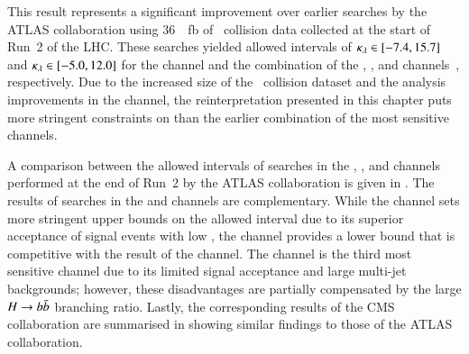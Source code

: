 This result represents a significant improvement over earlier searches by the
ATLAS collaboration using \SI{36}{\per\femto\barn} of \pp~collision data
collected at the start of Run~2 of the LHC. These searches yielded allowed
\klambda intervals of \mbox{$\kappa_{\lambda} \in [-7.4, 15.7]$} and
\mbox{$\kappa_{\lambda} \in [-5.0, 12.0]$} for the \bbtautau channel and the combination
of the \bbbb, \bbtautau, and \bbyy channels~\cite{HDBS-2018-58},
respectively. Due to the increased size of the \pp~collision dataset and the
analysis improvements in the \bbtautau channel, the reinterpretation presented
in this chapter puts more stringent constraints on \klambda than the earlier
combination of the most sensitive channels.

A comparison between the allowed \klambda intervals of searches in the \bbbb,
\bbtautau, and \bbyy channels performed at the end of Run~2 by the ATLAS
collaboration is given in . The results of searches in
the \bbtautau and \bbyy channels are complementary. While the \bbyy channel sets
more stringent upper bounds on the allowed \klambda interval due to its superior
acceptance of signal events with low \mHH, the \bbtautau channel provides a
lower bound that is competitive with the result of the \bbyy channel. The \bbbb
channel is the third most sensitive channel due to its limited signal acceptance
and large multi-jet backgrounds; however, these disadvantages are partially
compensated by the large $H \to b\bar{b}$ branching ratio. Lastly, the
corresponding results of the CMS collaboration are summarised in
 showing similar findings to those of the ATLAS
collaboration.

